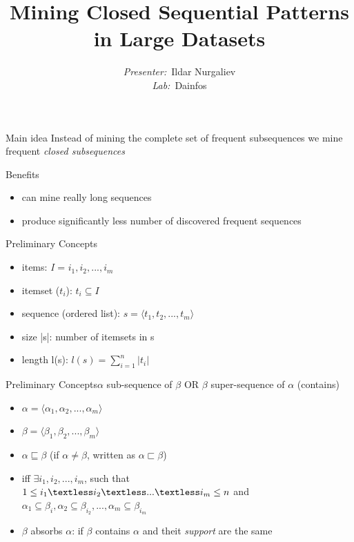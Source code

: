\documentclass[14pt]{beamer}
\title{\fontsize{15}{15}\selectfont
	\textbf{Mining Closed Sequential Patterns in Large Datasets
}}
\author{
	\fontvi
	\small{%
\emph{Presenter:}~Ildar Nurgaliev\\%
\emph{Lab:}~Dainfos}\\%
}
\date{}
\begin{document}
\maketitle

\begin{frame}{Main idea}
  Instead of mining the complete set of frequent subsequences we mine frequent \textit{closed subsequences}
\end{frame}

\begin{frame}{Benefits}
\begin{itemize}
\item can mine really long sequences
\item produce significantly less number of discovered frequent sequences
\end{itemize}
\end{frame}

\begin{frame}{Preliminary Concepts}
\begin{itemize}
\item items: \textit{I} = {$i_1, i_2, ..., i_m$}
\item itemset ($t_i$): $t_i \subseteq \textit{I}$
\item sequence (ordered list): $s = \langle t_1, t_2, ..., t_m \rangle$
\item size |s|: number of itemsets in s
\item length l(s): $l(s)=\sum\limits_{i=1}^n |t_i|$
\end{itemize}
\end{frame}

\begin{frame}{Preliminary Concepts}{$\alpha$ sub-sequence of $\beta$ OR $\beta$ super-sequence of $\alpha$ (contains)}
\begin{itemize}
\item $\alpha = \langle \alpha_1, \alpha_2, ..., \alpha_m \rangle$
\item $\beta = \langle \beta_1, \beta_2, ..., \beta_m \rangle$
\item $\alpha \sqsubseteq \beta$ (if $\alpha \neq \beta$, written as $\alpha \sqsubset \beta$)
\item iff $\exists i_1, i_2,...,i_m$, such that\\ $1 \leq i_1 \textless i_2 \textless ... \textless i_m \leq n$ and\\ $\alpha_1 \subseteq \beta_i,\alpha_2 \subseteq \beta_{i_2},...,\alpha_m \subseteq \beta_{i_m}$
\item $\beta$ absorbs $\alpha$: if $\beta$ contains $\alpha$ and theit \textit{support} are the same
\end{itemize}
\end{frame}
\end{document}
